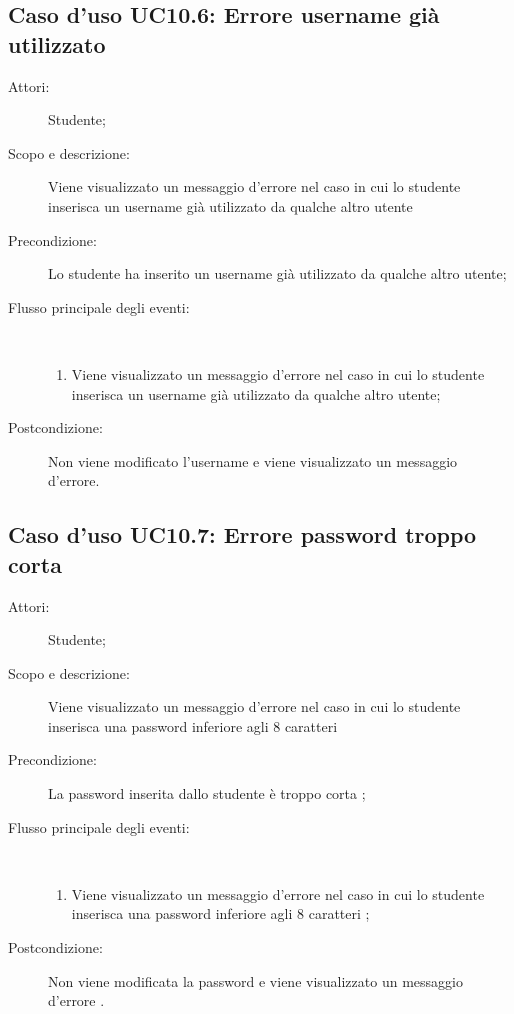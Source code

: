 \subsection{Caso d'uso UC10.6: Errore username già utilizzato}\begin{description}
	\item[Attori:] Studente;
	\item[Scopo e descrizione:] Viene visualizzato un messaggio d'errore nel caso in cui lo studente inserisca un username già utilizzato da qualche altro utente
	\item[Precondizione:] Lo studente ha inserito un username già utilizzato da qualche altro utente;
	
	\item[Flusso principale degli eventi:] \ 
	\begin{enumerate}
		\item Viene visualizzato un messaggio d'errore nel caso in cui lo studente inserisca un username già utilizzato da qualche altro utente;
		
	\end{enumerate}
	\item[Postcondizione:] Non viene modificato l'username e viene visualizzato un messaggio d'errore.
\end{description}
\hypertarget{UC10.7}{}
\subsection{Caso d'uso UC10.7: Errore password troppo corta}\begin{description}
	\item[Attori:] Studente;
	\item[Scopo e descrizione:] Viene visualizzato un messaggio d'errore nel caso in cui lo studente inserisca una password inferiore agli 8 caratteri
	
	\item[Precondizione:] La password inserita dallo studente è troppo corta
	;
	
	\item[Flusso principale degli eventi:] \ 
	\begin{enumerate}
		\item Viene visualizzato un messaggio d'errore nel caso in cui lo studente inserisca una password inferiore agli 8 caratteri	;
		
	\end{enumerate}
	\item[Postcondizione:] Non viene modificata la password e viene visualizzato un messaggio d'errore
	.
\end{description}
\hypertarget{UC11}{}
